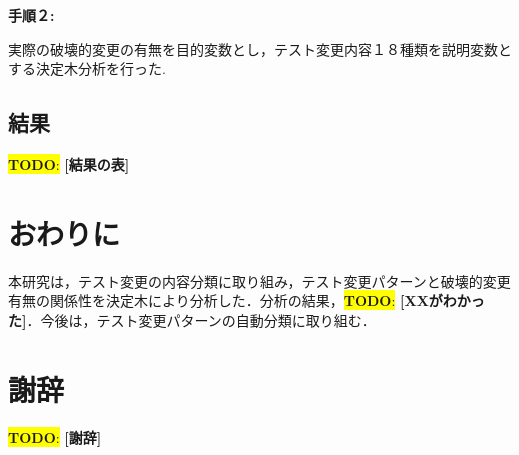\documentclass[uplatex,dvipdfmx,a4paper,twocolumn,base=11pt,jbase=11pt,ja=standard]{bxjsarticle}  %
\newcommand{\todo}[1]{\colorbox{yellow}{{\bf TODO}:}{\color{red} {\textbf{[#1]}}}}
\begin{document}
\noindent\textbf{手順２: }

実際の破壊的変更の有無を目的変数とし，テスト変更内容１８種類を説明変数とする決定木分析を行った.

\subsection{結果}

\todo{結果の表}



\section{おわりに}

本研究は，テスト変更の内容分類に取り組み，テスト変更パターンと破壊的変更有無の関係性を決定木により分析した．分析の結果，\todo{XXがわかった}．今後は，テスト変更パターンの自動分類に取り組む．

\section*{謝辞}

\todo{謝辞}

 

\end{document}
